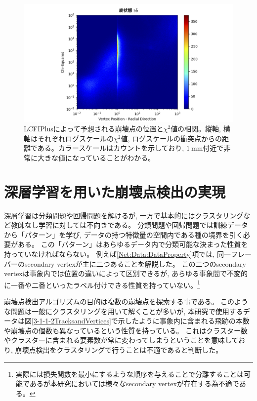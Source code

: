 \begin{figure}[htbp]
 \centering
 \includegraphics[width=1.0\textwidth, clip]{Figure/3Networks/3-1-2-4VertexPositionsvsChiSquare.png}
 \caption[LCFIPlusによって予想される崩壊点の位置と$\chi^2$値の相関]{LCFIPlusによって予想される崩壊点の位置と$\chi^2$値の相関。縦軸, 横軸はそれぞれログスケールの$\chi^2$値, ログスケールの衝突点からの距離である。カラースケールはカウントを示しており, $1\ \mathrm{mm}$付近で非常に大きな値になっていることがわかる。}
 \label{3-1-2-4VertexPositionsvsChiSquare}
\end{figure}

\newpage
\section{深層学習を用いた崩壊点検出の実現} \label{Net:forVertexFinderwithDL}

深層学習は分類問題や回帰問題を解けるが, 一方で基本的にはクラスタリングなど教師なし学習に対しては不向きである。
分類問題や回帰問題では訓練データから「パターン」を学び, データの持つ特徴量の空間内である種の境界を引く必要がある。
この「パターン」はあらゆるデータ内で分類可能な決まった性質を持っていなければならない。
例えば\ref{Net:Data:DataProperty}項では, 同一フレーバーのsecondary vertexが主に二つあることを解説した。
この二つのsecondary vertexは事象内では位置の違いによって区別できるが, あらゆる事象間で不変的に一番や二番といったラベル付けできる性質を持っていない。\footnote{実際には損失関数を最小にするような順序を与えることで分離することは可能であるが本研究においては様々なsecondary vertexが存在する為不適である。}

崩壊点検出アルゴリズムの目的は複数の崩壊点を探索する事である。
このような問題は一般にクラスタリングを用いて解くことが多いが, 本研究で使用するデータは図\ref{3-1-1-2TracksandVertices}で示したように事象内に含まれる飛跡の本数や崩壊点の個数も異なっているという性質を持っている。
これはクラスター数やクラスターに含まれる要素数が常に変わってしまうということを意味しており, 崩壊点検出をクラスタリングで行うことは不適であると判断した。

